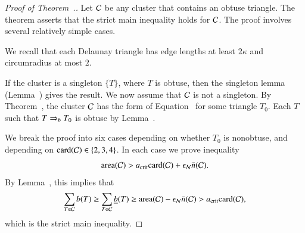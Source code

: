 \begin{proof}[Proof of Theorem~.]
  Let $\mathcal C$ be any cluster that contains an obtuse triangle.
  The theorem asserts that the strict main inequality holds for $\mathcal C$.
  The proof involves several relatively simple cases.  

  We recall that each Delaunay triangle has edge lengths at
  least $2\kappa$ and circumradius at most $2$.

  If the cluster is a singleton $\{T\}$, where $T$ is obtuse, then the
  singleton lemma (Lemma~) gives the result.  We
  now assume that $\mathcal C$ is not a singleton.  By
  Theorem~, the cluster $\mathcal C$ has the form of
  Equation~ for some triangle $T_0$.  Each $T$ such
  that $T\Rightarrow_{b} T_0$ is obtuse by Lemma~.

  We break the proof into six cases depending on whether $T_0$ is
  nonobtuse, and depending on ${\operatorname{card}}(\mathcal C)\in \{2,3,4\}$.  In each case
  we prove inequality
\begin{equation}\libel{eqn:n}
 \area(\C) > \acrit \card(\C) + \epsN \tn(\C).
\end{equation}
By Lemma~,    this implies that
\[
\sum_{T\in\mathcal C} b(T) \ge \sum_{T\in\mathcal C} \underline{b}(T) 
\ge {\operatorname{area}}(\mathcal C) -  \epsilon_{\mathcal N}\bar n(\mathcal C) 
> a_\text{crit} {\operatorname{card}}(\mathcal C),
\]
which is the strict main inequality.


\end{proof}
